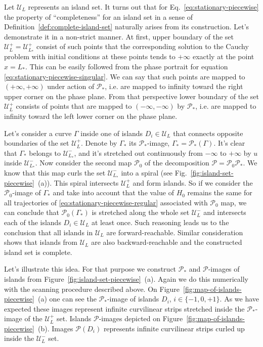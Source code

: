 Let $\mathscr{U}_L$ represents an island set.
It turns out that for Eq.~\eqref{eq:stationary-piecewise} the property of ``completeness''  for an island set in a sense of Definition~\ref{def:complete-island-set} naturally arises from its construction.
Let's demonstrate it in a non-strict manner.
At first, upper boundary of the set $\mathscr{U}_L^+ = \mathscr{U}_{L_*}^+$ consist of such points that the corresponding solution to the Cauchy problem with initial conditions at these points tends to $+\infty$ exactly at the point $x = L_*$.
This can be easily followed from the phase portrait for equation \eqref{eq:stationary-piecewise-singular}.
We can say that such points are mapped to $(+\infty, +\infty)$ under action of $\mathcal{P}_*$, i.e. are mapped to infinity toward the right upper corner on the phase plane.
From that perspective lower boundary of the set $\mathscr{U}_L^+$ consists of points that are mapped to $(-\infty, -\infty)$ by $\mathcal{P}_*$, i.e. are mapped to infinity toward the left lower corner on the phase plane.

Let's consider a curve $\Gamma$ inside one of islands $D_i \in \mathscr{U}_L$ that connects opposite boundaries of the set $\mathscr{U}_L^+$.
Denote by $\Gamma_*$ its $\mathcal{P}_*$-image, $\Gamma_* = \mathcal{P}_*(\Gamma)$.
It's clear that $\Gamma_*$ belongs to $\mathscr{U}_{L_*}^-$, and it's stretched out continuously from $-\infty$ to $+\infty$ by $u$ inside $\mathscr{U}_{L_*}^-$.
Now consider the second map $\mathcal{P}_0$ of the decomposition $\mathcal{P} = \mathcal{P}_0 \mathcal{P}_*$.
We know that this map curls the set $\mathscr{U}_{L_*}^-$ into a spiral (see Fig.~\ref{fig:island-set-piecewise}~(a)).
This spiral intersects $\mathscr{U}_L^+$ and form islands.
So if we consider the $\mathcal{P}_0$-image of $\Gamma_*$ and take into account that the value of $H_0$ remains the same for all trajectories of \eqref{eq:stationary-piecewise-regular} associated with $\mathcal{P}_0$ map, we can conclude that $\mathcal{P}_0(\Gamma_*)$ is stretched along the whole set $\mathscr{U}_L^-$ and intersects each of the islands $D_i \in \mathscr{U}_L$ at least once.
Such reasoning leads us to the conclusion that all islands in $\mathscr{U}_L$ are forward-reachable.
Similar consideration shows that islands from $\mathscr{U}_L$ are also backward-reachable and the constructed island set is complete.

Let's illustrate this idea.
For that purpose we construct $\mathcal{P}_*$ and $\mathcal{P}$-images of islands from Figure~\ref{fig:island-set-piecewise}~(a).
Again we do this numerically with the scanning procedure described above.
On Figure~\ref{fig:map-of-islands-piecewise}~(a) one can see the $\mathcal{P}_*$-image of islands $D_i$, $i \in \{ -1, 0, +1\}$.
As we have expected these images represent infinite curvilinear strips stretched inside the $\mathcal{P}_*$-image of the $\mathscr{U}_L^+$ set.
Islands $\mathcal{P}$-images depicted on Figure~\ref{fig:map-of-islands-piecewise}~(b).
Images $\mathcal{P}(D_i)$ represents infinite curvilinear strips curled up inside the $\mathscr{U}_L^-$ set.

